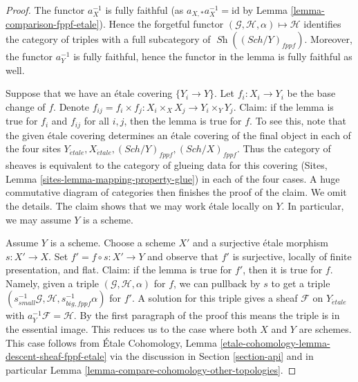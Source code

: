 \documentclass{stacks-project}
\theoremstyle{plain}
\theoremstyle{definition}
\theoremstyle{remark}
\numberwithin{equation}{subsection}
\def\Sch{\mathit{Sch}}
\def\Sh{\mathop{\mathit{Sh}}\nolimits}
\def\etale{{\acute{e}tale}}
\begin{document}
\begin{proof}
The functor $a_X^{-1}$ is fully faithful (as $a_{X, *}a_X^{-1} = \text{id}$ by
Lemma \ref{lemma-comparison-fppf-etale}). Hence the forgetful functor
$(\mathcal{G}, \mathcal{H}, \alpha) \mapsto \mathcal{H}$ identifies the
category of triples with a full subcategory of $\Sh((\Sch/Y)_{fppf})$.
Moreover, the functor $a_Y^{-1}$ is fully faithful, hence the functor
in the lemma is fully faithful as well.

\medskip\noindent
Suppose that we have an \'etale covering $\{Y_i \to Y\}$.
Let $f_i : X_i \to Y_i$ be the base change of $f$.
Denote $f_{ij} = f_i \times f_j : X_i \times_X X_j  \to Y_i \times_Y Y_j$.
Claim: if the lemma is true for $f_i$ and $f_{ij}$ for all $i, j$, then
the lemma is true for $f$. To see this, note that the given \'etale covering
determines an \'etale covering of the final object in each of
the four sites $Y_\etale, X_\etale, (\Sch/Y)_{fppf}, (\Sch/X)_{fppf}$.
Thus the category of sheaves is equivalent to the category of
glueing data for this covering
(Sites, Lemma \ref{sites-lemma-mapping-property-glue})
in each of the four cases. A huge commutative diagram of
categories then finishes the proof of the claim. We omit the details.
The claim shows that we may work \'etale locally on $Y$.
In particular, we may assume $Y$ is a scheme.

\medskip\noindent
Assume $Y$ is a scheme. Choose a scheme $X'$ and a surjective \'etale
morphism $s : X' \to X$. Set $f' = f \circ s : X' \to Y$ and observe
that $f'$ is surjective, locally of finite presentation, and flat.
Claim: if the lemma is true for $f'$, then it is true for $f$.
Namely, given a triple $(\mathcal{G}, \mathcal{H}, \alpha)$
for $f$, we can pullback by $s$ to get a triple
$(s_{small}^{-1}\mathcal{G}, \mathcal{H}, s_{big, fppf}^{-1}\alpha)$
for $f'$. A solution for this triple gives a sheaf
$\mathcal{F}$ on $Y_\etale$ with $a_Y^{-1}\mathcal{F} = \mathcal{H}$.
By the first paragraph of the proof this means the triple is
in the essential image. This reduces us to the case
where both $X$ and $Y$ are schemes. This case follows from
\'Etale Cohomology, Lemma
\ref{etale-cohomology-lemma-descent-sheaf-fppf-etale}
via the discussion in Section \ref{section-api}
and in particular Lemma \ref{lemma-compare-cohomology-other-topologies}.
\end{proof}
\end{document}
